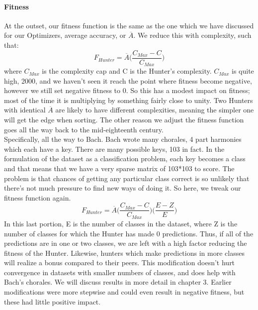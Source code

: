 \paragraph{Fitness}
At the outset, our fitness function is the same as the one which we have discussed for our Optimizers, average accuracy, or $\overline{A}$.  We reduce this with complexity, such that: $$F_{Hunter} = \overline{A} \bigg( \frac{C_{Max} - C}{C_{Max}}\bigg)$$
where $C_{Max}$ is the complexity cap and C is the Hunter's complexity.  $C_{Max}$ is quite high, 2000, and we haven't seen it reach the point where fitness become negative, however we still set negative fitness to 0.  So this has a modest impact on fitness; most of the time it is multiplying by something fairly close to unity.  Two Hunters with identical $\overline{A}$ are likely to have different complexities, meaning the simpler one will get the edge when sorting. The other reason we adjust the fitness function goes all the way back to the mid-eighteenth century.\\
Specifically, all the way to Bach.  Bach wrote many chorales, 4 part harmonies which each have a key.  There are many possible keys, 103 in fact.  In the formulation of the dataset as a classification problem, each key becomes a class and that means that we have a very sparse matrix of 103*103 to score.  The problem is that chances of getting any particular class correct is so unlikely that there's not much pressure to find new ways of doing it.  So here, we tweak our fitness function again.  $$F_{Hunter} = \overline{A} \bigg( \frac{C_{Max} - C}{C_{Max}}\bigg) \bigg( \frac{E-Z}{E}\bigg)$$
In this last portion, E is the number of classes in the dataset, where Z is the number of classes for which the Hunter has made 0 predictions.  Thus, if all of the predictions are in one or two classes, we are left with a high factor reducing the fitness of the Hunter.  Likewise, hunters which make predictions in more classes will realize a bonus compared to their peers.
This modification doesn't hurt convergence in datasets with smaller numbers of classes, and does help with Bach's chorales.  We will discuss results in more detail in chapter 3.  Earlier modifications were more stepwise and could even result in negative fitness, but these had little positive impact.
